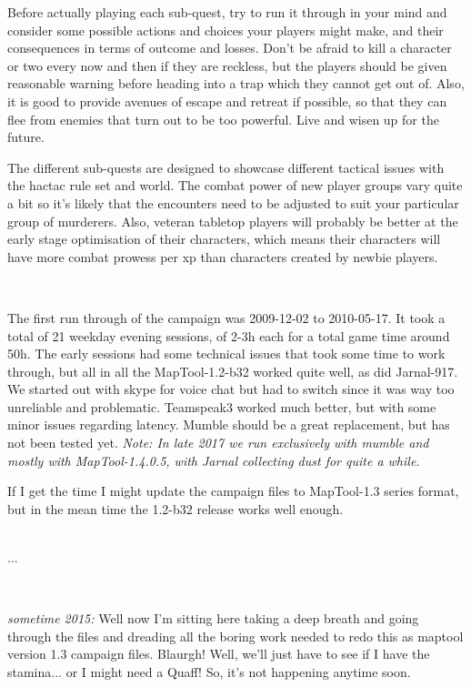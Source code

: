 \documentclass[11pt, twoside, titlepage, a4paper]{report}
\begin{document}
Before actually playing each sub-quest, try to run it through in your mind and consider some possible actions and choices your players might make, and their consequences in terms of outcome and losses. Don't be afraid to kill a character or two every now and then if they are reckless, but the players should be given reasonable warning before heading into a trap which they cannot get out of. Also, it is good to provide avenues of escape and retreat if possible, so that they can flee from enemies that turn out to be too powerful. Live and wisen up for the future.

The different sub-quests are designed to showcase different tactical issues with the hactac rule set and world. The combat power of new player groups vary quite a bit so it's likely that the encounters need to be adjusted to suit your particular group of murderers. Also, veteran tabletop players will probably be better at the early stage optimisation of their characters, which means their characters will have more combat prowess per xp than characters created by newbie players.

\

The first run through of the campaign was 2009-12-02 to 2010-05-17. It took a total of 21 weekday evening sessions, of 2-3h each for a total game time around 50h. The early sessions had some technical issues that took some time to work through, but all in all the MapTool-1.2-b32 worked quite well, as did Jarnal-917. We started out with skype for voice chat but had to switch since it was way too unreliable and problematic. Teamspeak3 worked much better, but with some minor issues regarding latency. Mumble should be a great replacement, but has not been tested yet. \emph{Note: In late 2017 we run exclusively with mumble and mostly with MapTool-1.4.0.5, with Jarnal collecting dust for quite a while.}

If I get the time I might update the campaign files to MapTool-1.3 series format, but in the mean time the 1.2-b32 release works well enough.\\

\

...

\

\emph{sometime 2015:} Well now I'm sitting here taking a deep breath and going through the files and dreading all the boring work needed to redo this as maptool version 1.3 campaign files. Blaurgh! Well, we'll just have to see if I have the stamina... or I might need a Quaff! So, it's not happening anytime soon.
\end{document}
